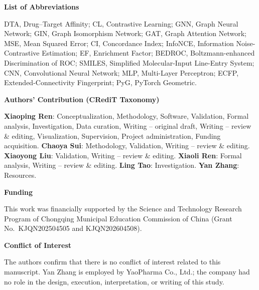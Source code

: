 \documentclass[10pt,a4paper,twocolumn]{article}
\begin{document}
\vspace{1em}
\noindent\textbf{List of Abbreviations}

\noindent DTA, Drug--Target Affinity; CL, Contrastive Learning; GNN, Graph Neural Network; GIN, Graph Isomorphism Network; GAT, Graph Attention Network; MSE, Mean Squared Error; CI, Concordance Index; InfoNCE, Information Noise-Contrastive Estimation; EF, Enrichment Factor; BEDROC, Boltzmann-enhanced Discrimination of ROC; SMILES, Simplified Molecular-Input Line-Entry System; CNN, Convolutional Neural Network; MLP, Multi-Layer Perceptron; ECFP, Extended-Connectivity Fingerprint; PyG, PyTorch Geometric.

\vspace{1em}
\noindent\textbf{Authors' Contribution (CRediT Taxonomy)}

\noindent\textbf{Xiaoping Ren}: Conceptualization, Methodology, Software, Validation, Formal analysis, Investigation, Data curation, Writing -- original draft, Writing -- review \& editing, Visualization, Supervision, Project administration, Funding acquisition. \textbf{Chaoya Sui}: Methodology, Validation, Writing -- review \& editing. \textbf{Xiaoyong Liu}: Validation, Writing -- review \& editing. \textbf{Xiaoli Ren}: Formal analysis, Writing -- review \& editing. \textbf{Ling Tao}: Investigation. \textbf{Yan Zhang}: Resources.

\vspace{0.5em}
\noindent\textbf{Funding}

\noindent This work was financially supported by the Science and Technology Research Program of Chongqing Municipal Education Commission of China (Grant No.\ KJQN202504505 and KJQN202604508).

\vspace{0.5em}
\noindent\textbf{Conflict of Interest}

\noindent The authors confirm that there is no conflict of interest related to this manuscript. Yan Zhang is employed by YaoPharma Co., Ltd.; the company had no role in the design, execution, interpretation, or writing of this study.
\end{document}
